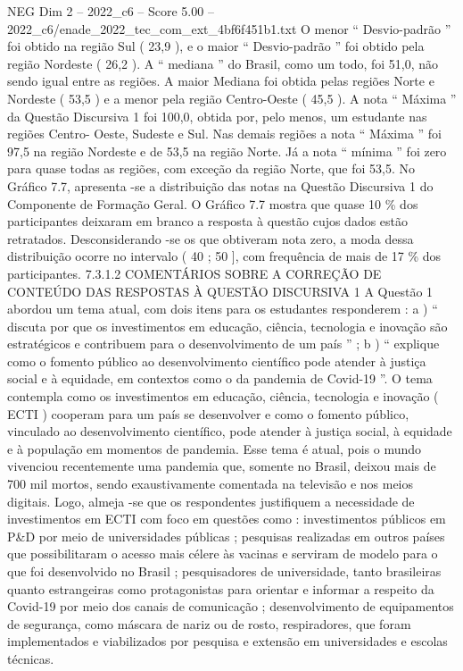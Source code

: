\begin{textsample}{NEG Dim 2 – 2022\_c6 – Score 5.00 – 2022\_c6/enade\_2022\_tec\_com\_ext\_4bf6f451b1.txt}
O menor “ Desvio-padrão ” foi obtido na região Sul ( 23,9 ), e o maior “ Desvio-padrão ” foi obtido pela região Nordeste ( 26,2 ).
A “ mediana ” do Brasil, como um todo, foi 51,0, não sendo igual entre as regiões.
A maior Mediana foi obtida pelas regiões Norte e Nordeste ( 53,5 ) e a menor pela região Centro-Oeste ( 45,5 ).
A nota “ Máxima ” da Questão Discursiva 1 foi 100,0, obtida por, pelo menos, um estudante nas regiões Centro- Oeste, Sudeste e Sul.
Nas demais regiões a nota “ Máxima ” foi 97,5 na região Nordeste e de 53,5 na região Norte.
Já a nota “ mínima ” foi zero para quase todas as regiões, com exceção da região Norte, que foi 53,5.
No Gráfico 7.7, apresenta -se a distribuição das notas na Questão Discursiva 1 do Componente de Formação Geral.
O Gráfico 7.7 mostra que quase 10 \% dos participantes deixaram em branco a resposta à questão cujos dados estão retratados.
Desconsiderando -se os que obtiveram nota zero, a moda dessa distribuição ocorre no intervalo ( 40 ; 50 ], com frequência de mais de 17 \% dos participantes. 7.3.1.2 COMENTÁRIOS SOBRE A CORREÇÃO DE CONTEÚDO DAS RESPOSTAS À QUESTÃO DISCURSIVA 1 A Questão 1 abordou um tema atual, com dois itens para os estudantes responderem : a ) “ discuta por que os investimentos em educação, ciência, tecnologia e inovação são estratégicos e contribuem para o desenvolvimento de um país ” ; b ) “ explique como o fomento público ao desenvolvimento científico pode atender à justiça social e à equidade, em contextos como o da pandemia de Covid-19 ”.
O tema contempla como os investimentos em educação, ciência, tecnologia e inovação ( ECTI ) cooperam para um país se desenvolver e como o fomento público, vinculado ao desenvolvimento científico, pode atender à justiça social, à equidade e à população em momentos de pandemia.
Esse tema é atual, pois o mundo vivenciou recentemente uma pandemia que, somente no Brasil, deixou mais de 700 mil mortos, sendo exaustivamente comentada na televisão e nos meios digitais.
Logo, almeja -se que os respondentes justifiquem a necessidade de investimentos em ECTI com foco em questões como : investimentos públicos em P\&D por meio de universidades públicas ; pesquisas realizadas em outros países que possibilitaram o acesso mais célere às vacinas e serviram de modelo para o que foi desenvolvido no Brasil ; pesquisadores de universidade, tanto brasileiras quanto estrangeiras como protagonistas para orientar e informar a respeito da Covid-19 por meio dos canais de comunicação ; desenvolvimento de equipamentos de segurança, como máscara de nariz ou de rosto, respiradores, que foram implementados e viabilizados por pesquisa e extensão em universidades e escolas técnicas.

\end{textsample}
